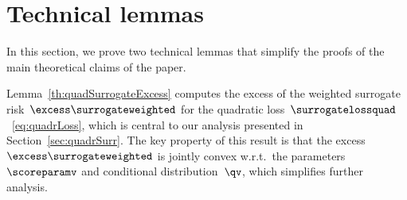 \documentclass{article}
\begin{document}
\section{Technical lemmas}
\label{sec:techLemmas}
In this section, we prove two technical lemmas that simplify the proofs of the main theoretical claims of the paper.

Lemma~\ref{th:quadSurrogateExcess} computes the excess of the weighted surrogate risk~$\excess\surrogateweighted$ for the quadratic loss~$\surrogatelossquad$~\eqref{eq:quadrLoss}, which is central to our analysis presented in Section~\ref{sec:quadrSurr}.
The key property of this result is that the excess~$\excess\surrogateweighted$ is jointly convex w.r.t.\ the parameters~$\scoreparamv$ and conditional distribution~$\qv$, which simplifies further analysis.
\end{document}
